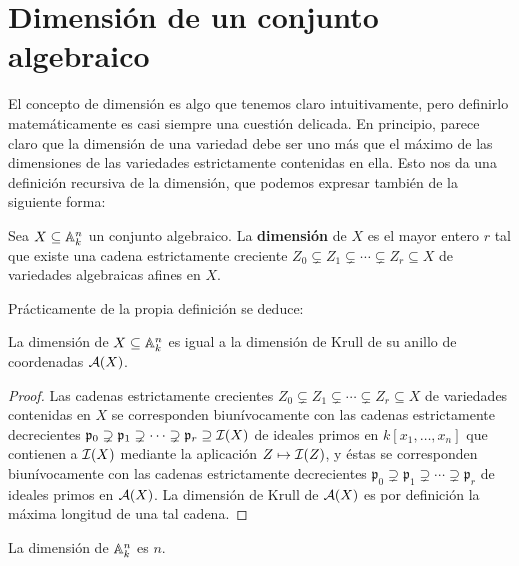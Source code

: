 \documentclass[ACGA.tex]{subfiles}
\begin{document}
\section{Dimensión de un conjunto algebraico}

El concepto de dimensión es algo que tenemos claro intuitivamente, pero definirlo matemáticamente es casi siempre una cuestión delicada. En principio, parece claro que la dimensión de una variedad debe ser uno más que el máximo de las dimensiones de las variedades estrictamente contenidas en ella. Esto nos da una definición recursiva de la dimensión, que podemos expresar también de la siguiente forma:

\begin{defi} Sea $X\subseteq \mathbb{A}^n_k$ un conjunto algebraico. La {\bf dimensión} de $X$ es el mayor entero $r$ tal que existe una cadena estrictamente creciente $Z_0\subsetneq Z_1\subsetneq \cdots\subsetneq Z_r\subseteq X$ de variedades algebraicas afines en $X$.

\end{defi}

Prácticamente de la propia definición se deduce:

\begin{prop}
La dimensión de $X\subseteq \mathbb{A}^n_k$ es igual a la dimensión de Krull de su anillo de coordenadas $\mathcal{A}(X)$. 
\end{prop}

\begin{proof}
 Las cadenas estrictamente crecientes $Z_0\subsetneq Z_1\subsetneq \cdots\subsetneq Z_r\subseteq X$ de variedades contenidas en $X$ se corresponden biunívocamente con las cadenas estrictamente decrecientes ${\mathfrak p}_0\supsetneq{\mathfrak p}_1\supsetneq\cdots\supsetneq{\mathfrak p}_r\supseteq \mathcal{I}(X)$ de ideales primos en $k[x_1,\ldots,x_n]$ que contienen a $\mathcal{I}(X)$ mediante la aplicación $Z\mapsto\mathcal{I}(Z)$, y éstas se corresponden biunívocamente con las cadenas estrictamente decrecientes ${\mathfrak p}_0\supsetneq{\mathfrak p}_1\supsetneq\cdots\supsetneq{\mathfrak p}_r$ de ideales primos en $\mathcal{A}(X)$. La dimensión de Krull de $\mathcal{A}(X)$ es por definición la máxima longitud de una tal cadena.
\end{proof}

\begin{coro}
 La dimensión de $\mathbb{A}^n_k$ es $n$.
\end{coro}
\end{document}
